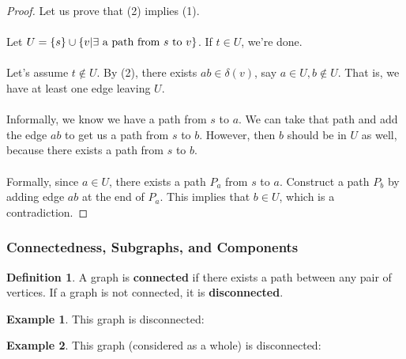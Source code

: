 \documentclass[]{article}
\theoremstyle{definition}
\newtheorem*{defn}{Definition}
\newtheorem{ex}{Example}[section]
\DeclarePairedDelimiter{\set}{\lbrace}{\rbrace}
\begin{document}
				\begin{proof}
					Let us prove that (2) implies (1).
					\\ \\
					Let $U = \set{s} \cup \set{v | \exists \text{ a path from } s \text{ to } v}$. If $t \in U$, we're done.
					\\ \\
					Let's assume $t \not \in U$. By (2), there exists $ab \in \delta(v)$, say $a \in U, b \not \in U$. That is, we have at least one edge leaving $U$.
					\\ \\
					Informally, we know we have a path from $s$ to $a$. We can take that path and add the edge $ab$ to get us a path from $s$ to $b$. However, then $b$ should be in $U$ as well, because there exists a path from $s$ to $b$.
					\\ \\
					Formally, since $a \in U$, there exists a path $P_a$ from $s$ to $a$. Construct a path $P_b$ by adding edge $ab$ at the end of $P_a$. This implies that $b \in U$, which is a contradiction.
				\end{proof}

			\subsubsection{Connectedness, Subgraphs, and Components}
				\begin{defn}
					A graph is \textbf{connected} if there exists a path between any pair of vertices. If a graph is not connected, it is \textbf{disconnected}.
				\end{defn}

				\begin{ex}
					This graph is disconnected:
					\begin{center}
					\end{center}
				\end{ex}

				\begin{ex}
					This graph (considered as a whole) is disconnected:
					\begin{center}
					\end{center}
				\end{ex}
\end{document}
